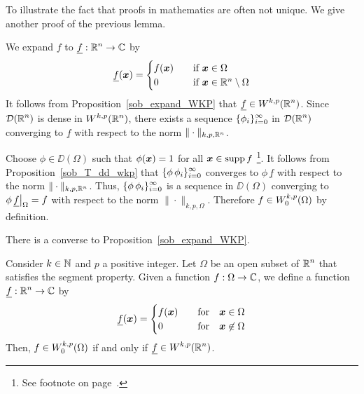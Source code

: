 \begin{rmk}
To illustrate the fact that proofs in mathematics are often not unique.
We give another proof of the previous lemma.

We expand $f$ to $\displaystyle \underline{f}:\mathbb{R}^n\rightarrow \mathbb{C}$ by
\[
\underline{f}({\bm{x}}) =
\begin{cases}
f({\bm{x}}) & \quad \text{if} \ {\bm{x}} \in \Omega \\
0 & \quad \text{if} \ {\bm{x}} \in \mathbb{R}^n \setminus \Omega
\end{cases}
\]
It follows from Proposition~\ref{sob_expand_WKP} that
$\displaystyle \underline{f} \in W^{k,p}(\mathbb{R}^n)$.  Since
$\displaystyle \mathcal{D}(\mathbb{R}^n)$
is dense in $\displaystyle W^{k,p}(\mathbb{R}^n)$, there exists a sequence
$\displaystyle \{\phi_i\}_{i=0}^\infty$ in 
$\displaystyle \mathcal{D}(\mathbb{R}^n)$ converging to $\underline{f}$ with respect
to the norm $\displaystyle \|\cdot\|_{k,p,\mathbb{R}^n}$.

Choose $\phi \in \DD(\Omega)$ such that
$\phi({\bm{x}}) = 1$ for all ${\bm{x}} \in \operatorname{supp} f$ \footnote{
See footnote on page~\pageref{FOOTNOTE1}.}.
It follows from Proposition~\ref{sob_T_dd_wkp} that
$\displaystyle \{\phi \, \phi_i\}_{i=0}^\infty$
converges to $\phi \,\underline{f}$ with respect to the norm
$\|\cdot\|_{k,p,\mathbb{R}^n}$.  Thus,
$\displaystyle \{\phi \, \phi_i\}_{i=0}^\infty$
is a sequence in $\DD(\Omega)$ converging to
$\displaystyle \phi \,\underline{f}\big|_{\Omega} = f$ with respect to the norm
$\|\cdot\|_{k,p,\Omega}$.  Therefore
$\displaystyle f\in W^{k,p}_0(\Omega)$ by definition.
\end{rmk}

There is a converse to Proposition~\ref{sob_expand_WKP}.

\begin{prop} \label{sob_expand_WKP_Conv}
Consider $k\in \mathbb{N}$ and $p$ a positive integer.  Let $\Omega$ be an
open subset of $\displaystyle \mathbb{R}^n$ that satisfies the segment
property.  Given a function $f:\Omega \rightarrow \mathbb{C}$,
we define a function $\displaystyle \underline{f}:\mathbb{R}^n\rightarrow \mathbb{C}$ by
\[
\underline{f}({\bm{x}}) =
\begin{cases}
f({\bm{x}}) & \quad \text{for} \quad {\bm{x}} \in \Omega \\
0 & \quad \text{for} \quad {\bm{x}} \not\in \Omega \\
\end{cases}
\]
Then, $\displaystyle f \in W^{k,p}_0(\Omega)$ if and only if
$\displaystyle \underline{f} \in W^{k,p}(\mathbb{R}^n)$.
\end{prop}

